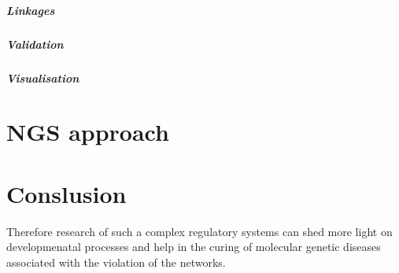\documentclass[a4paper, twoside]{report}
\begin{document}
\subparagraph{Linkages}

\subparagraph{Validation}

\subparagraph{Visualisation}

\section*{NGS approach}

\section*{Conslusion}


Therefore research of such a complex regulatory systems can shed more light on developmenatal processes and help in the curing of molecular genetic diseases associated with the violation of the networks.
\end{document}
